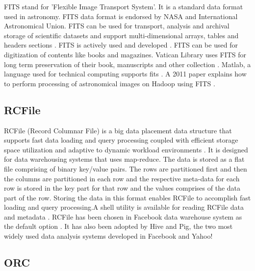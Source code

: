 {     FITS stand for 'Flexible Image Transport System'. It is a
     standard data format used in astronomy. FITS data format is
     endorsed by NASA and International Astronomical Union. FITS can
     be used for transport,
     analysis and archival storage of scientific datasets and support
     multi-dimensional arrays, tables and headers
     sections \cite{www-fits-nasa}.
     FITS is actively used and developed \cite{www-news-fits-2016}.
     FITS can be used for
     digitization of contents like books and
     magazines. Vatican Library uses FITS
     for long term preservation of their book, manuscripts and other
     collection \cite{www-fits-vatican-library}. Matlab, a language used
     for technical computing
     supports fits \cite{www-fits-matlab}. A 2011 paper
     explains how to perform
     processing of astronomical images on Hadoop using FITS \cite{paper-fits-2011}.

     \pv

\subsection{RCFile}

     RCFile (Record Columnar File) is a big
     data placement data structure that supports fast data loading and
     query processing coupled with efficient storage space utilization
     and adaptive to dynamic workload environments \cite{www-rcfile-wiki}.
     It is designed for
     data warehousing systems that uses map-reduce. The data is stored
     as a flat file comprising of binary key/value pairs. The rows are
     partitioned first and then the columns are partitioned in each
     row and the respective meta-data for each row is stored in the
     key part for that row and the values comprises of the data part
     of the row. Storing the data in this format enables RCFile to
     accomplish fast loading and query processing.A shell utility is
     available for reading RCFile data and metadata
     \cite{www-rcfile-cat}. RCFile has
     been chosen in Facebook data warehouse system as the default
     option \cite{he2011rcfile}. It has also been adopted by
     Hive and Pig, the two most
     widely used data analysis systems developed in Facebook and
     Yahoo!

     \pv

\subsection{ORC}

}
